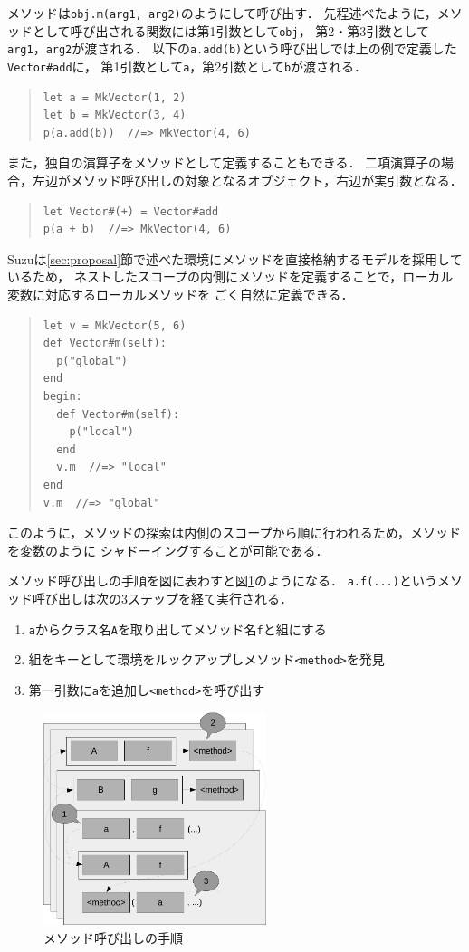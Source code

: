 \documentclass{ipsjprosym}
\begin{document}
メソッドは\verb|obj.m(arg1, arg2)|のようにして呼び出す．
先程述べたように，メソッドとして呼び出される関数には第1引数として\verb|obj|，
第2・第3引数として\verb|arg1|，\verb|arg2|が渡される．
以下の\verb|a.add(b)|という呼び出しでは上の例で定義した\verb|Vector#add|に，
第1引数として\verb|a|，第2引数として\verb|b|が渡される．
\begin{quote}
\begin{verbatim}
let a = MkVector(1, 2)
let b = MkVector(3, 4)
p(a.add(b))  //=> MkVector(4, 6)
\end{verbatim}
\end{quote}
また，独自の演算子をメソッドとして定義することもできる．
二項演算子の場合，左辺がメソッド呼び出しの対象となるオブジェクト，右辺が実引数となる．
\begin{quote}
\begin{verbatim}
let Vector#(+) = Vector#add
p(a + b)  //=> MkVector(4, 6)
\end{verbatim}
\end{quote}

Suzuは\ref{sec:proposal}節で述べた環境にメソッドを直接格納するモデルを採用しているため，
ネストしたスコープの内側にメソッドを定義することで，ローカル変数に対応するローカルメソッドを
ごく自然に定義できる．
\begin{quote}
\begin{verbatim}
let v = MkVector(5, 6)
def Vector#m(self):
  p("global")
end
begin:
  def Vector#m(self):
    p("local")
  end
  v.m  //=> "local"
end
v.m  //=> "global"
\end{verbatim}
\end{quote}
このように，メソッドの探索は内側のスコープから順に行われるため，メソッドを変数のように
シャドーイングすることが可能である．

メソッド呼び出しの手順を図に表わすと図\ref{fig:method-call}のようになる．
\verb|a.f(...)|というメソッド呼び出しは次の3ステップを経て実行される．
\begin{enumerate}
\item \verb|a|からクラス名\verb|A|を取り出してメソッド名\verb|f|と組にする
\item 組をキーとして環境をルックアップしメソッド\verb|<method>|を発見
\item 第一引数に\verb|a|を追加し\verb|<method>|を呼び出す
\end{enumerate}

\begin{figure}
	\centering
	\includegraphics[width=6.5cm]{fig/method-call-crop.pdf}
	\caption{メソッド呼び出しの手順}
	\label{fig:method-call}
\end{figure}
\end{document}
